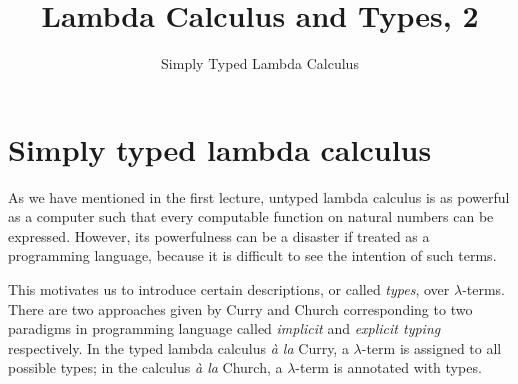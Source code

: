 \title{Lambda Calculus and Types, 2}
\subtitle{Simply Typed Lambda Calculus}

\begin{frame}
\maketitle
\end{frame}

\section{Simply typed lambda calculus}
As we have mentioned in the first lecture, untyped lambda calculus is as powerful as
a computer such that every computable function on natural numbers can be
expressed. However, its powerfulness can be a disaster if treated as a
programming language, because it is difficult to see the intention of such
terms. 

This motivates us to introduce certain descriptions, or called \emph{types}, over
$\lambda$-terms. There are two approaches given by Curry and Church
corresponding to two paradigms in programming language called \emph{implicit}
and \emph{explicit typing} respectively.  In the typed lambda calculus
\textit{\`a la} Curry, a $\lambda$-term is assigned to all possible types; in
the calculus \textit{\`a la} Church, a $\lambda$-term is annotated with types. 

